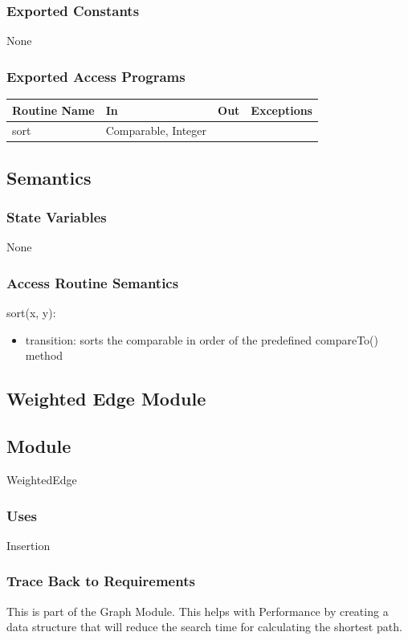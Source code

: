 \documentclass[12pt]{article}
\begin{document}
\subsubsection*{Exported Constants}
None

\subsubsection*{Exported Access Programs}
    \begin{tabular}{|l|l|l|l|}
    \hline
    \textbf{Routine Name} & \textbf{In} & \textbf{Out} & \textbf{Exceptions}\\
    \hline
    sort & Comparable, Integer & ~ & ~\\
    \hline
    \end{tabular}
    
\subsection*{Semantics}
\subsubsection*{State Variables}
None

\subsubsection*{Access Routine Semantics}
\noindent sort(x, y):
\begin{itemize}
    \item transition: sorts the comparable in order of the predefined compareTo() method
\end{itemize}

\newpage
\subsection{Weighted Edge Module}
\subsection*{Module}
WeightedEdge

\subsubsection*{Uses}
Insertion

\subsubsection*{Trace Back to Requirements}
This is part of the Graph Module. This helps with Performance by creating a data structure that will reduce the search time for calculating the shortest path.
\end{document}
